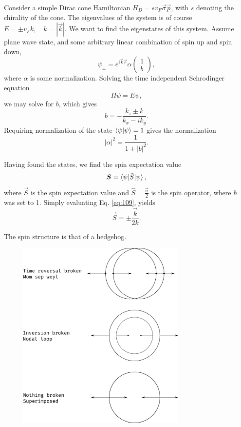Consider a simple Dirac cone Hamiltonian \(H_{D} = s v_{F} \vec{\sigma} \vec{p}\), with \(s\) denoting the chirality of the cone.
The eigenvalues of the system is of course \(E = \pm v_{F} k, \quad k=|\vec{k}|\).
We want to find the eigenstates of this system.
Assume plane wave state, and some arbitrary linear combination of spin up and spin down,
\[
  \psi _{\pm} = e^{i \vec{k} \vec{r}} \alpha
  \begin{pmatrix}
    1\\
    b
  \end{pmatrix},
\]
where \(\alpha \) is some normalization.
Solving the time independent Schrodinger equation
\[
H \psi = E \psi,
\]
we may solve for \(b\), which gives
\begin{equation}
  \label{eq:108}
  b = -\frac{k_{z} \pm k}{k_{x} - i k_{y}}.
\end{equation}
Requiring normalization of the state \(\braket{\psi | \psi } = 1\) gives the normalization
\[
|\alpha |^2 = \frac{1}{1 + |b|^2}.
\]

Having found the states, we find the spin expectation value
\begin{equation}
  \label{eq:109}
  \bm{S} = \braket{\psi | \hat{S} | \psi },
\end{equation}
where \(\vec{S}\) is the spin expectation value and \(\hat{S} = \frac{\vec{\sigma}}{2} \) is the spin operator, where \(\hbar \) was set to 1.
Simply evaluating Eq. \eqref{eq:109}, yields
\begin{equation}
  \label{eq:110}
  \vec{S} = \pm \frac{\vec{k}}{2 k}.
\end{equation}

The spin structure is that of a hedgehog.

\begin{figure}[ht]
  \centering
  \includegraphics[width=0.75\textwidth]{figures/spinStructureWeyl}
  \caption{\label{fig:spinStructure} }
\end{figure}




